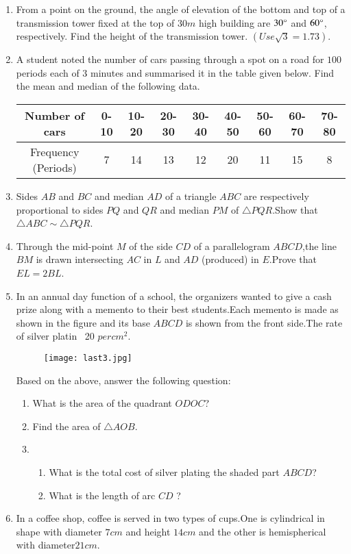 \documentclass[12pt,-letter paper]{article}
\providecommand{\brak}[1]{\ensuremath{\left(#1\right)}}
\begin{document}
\begin{enumerate}
\item From a point on the ground, the angle of elevation of the bottom and top of a transmission tower fixed at the top of $30 m$ high building are $30\degree$ and $60\degree$, respectively. Find the height of the transmission tower. $\brak{Use\sqrt{3} = 1.73}$.

\item A student noted the number of cars passing through a spot on a road for $100$ periods each of $3$ minutes and summarised it in the table given below. Find the mean and median of the following data.\\

	\begin{tabular}{|c|c|c|c|c|c|c|c|c|}
\hline
Number of cars & 0-10 & 10-20 & 20-30 & 30-40 & 40-50 & 50-60 & 60-70 & 70-80\\ 
\hline
Frequency (Periods) & 7 & 14 & 13 & 12 & 20 & 11 & 15 & 8\\ 
\hline

\end{tabular}

\item Sides $AB$ and $BC$ and median $AD$ of a triangle $ABC$ are respectively proportional to sides $PQ$ and $QR$ and median $PM$ of $\triangle PQR$.Show that $\triangle ABC \sim \triangle PQR$.

\item Through the mid-point $M$ of the side $CD$ of a parallelogram $ABCD$,the line $BM$ is drawn intersecting $AC$ in $L$ and $AD$ (produced) in $E$.Prove that $EL = 2BL$. 

\item In an annual day function of a school, the organizers wanted to give a cash prize along with a memento to their best students.Each memento is made as shown in the figure and its base $ABCD$ is shown from the front side.The rate of silver platin \rupee~20 $per  cm^2$.

	\begin{figure}[!ht]
		\centering
		\texttt{[image: last3.jpg]}
		\caption{}
		\label{fig:enter-label}
	\end{figure}

	\text Based on the above, answer the following question:
		\begin{enumerate}
			\item What is the area of the quadrant $ODOC$?
			\item Find the area of $\triangle AOB$.
			\item
			\begin{enumerate}
				\item What is the total cost of silver plating the shaded part $ABCD$?
				\item What is the length of arc $CD$ ?
			\end{enumerate}
		\end{enumerate}
\newpage
\item In a coffee shop, coffee is served in two types of cups.One is cylindrical  in shape with diameter $7 cm$ and height $14 cm $ and the other is hemispherical with diameter$21 cm$.


\end{enumerate}
\end{document}
